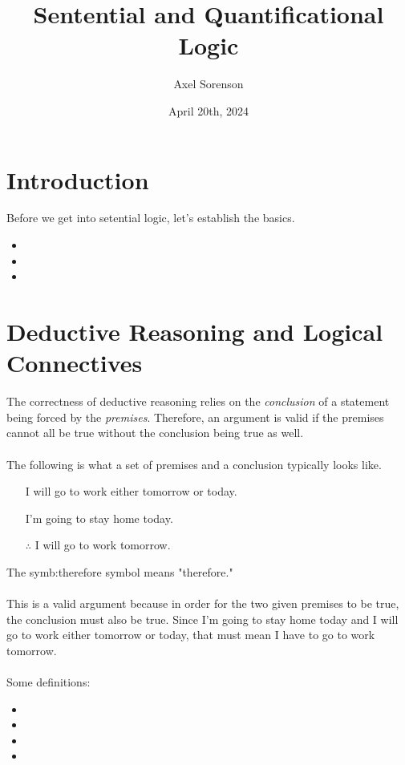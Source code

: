 \documentclass{article}
\title{Sentential and Quantificational Logic}
\author{Axel Sorenson}
\date{April 20th, 2024}
\begin{document}
\maketitle

\section{Introduction}
Before we get into setential logic, let's establish the basics.\\
\begin{itemize}
	\item {}
	\item {}
	\item {}
\end{itemize}

\section{Deductive Reasoning and Logical Connectives}
The correctness of deductive reasoning relies on the \textit{conclusion} of a statement being forced by the \textit{premises}. Therefore, an argument is valid if the premises cannot all be true without the conclusion being true as well.\\\\
\noindent
The following is what a set of premises and a conclusion typically looks like.\\

\begin{itemize}
    \item[] I will go to work either tomorrow or today.
    \item[] I'm going to stay home today.
    \item[$\therefore$] I will go to work tomorrow.
\end{itemize}

\noindent The \gls{symb:therefore} symbol means "therefore."\\\\
\noindent
This is a valid argument because in order for the two given premises to be true, the conclusion must also be true. Since I'm going to stay home today and I will go to work either tomorrow or today, that must mean I have to go to work tomorrow.\\\\
\noindent
Some definitions:
\begin{itemize}
	\item {}
	\item {}
	\item {}
	\item {}
\end{itemize}
\end{document}
